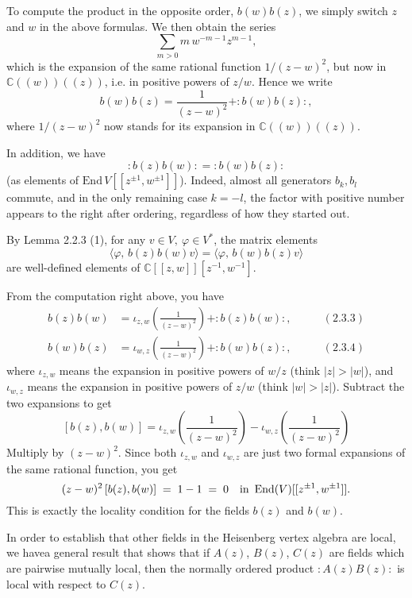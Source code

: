 \documentclass[12pt]{article}
\begin{document}
To compute the product in the opposite order, \(b(w)b(z)\),
we simply switch \(z\) and \(w\) in the above formulas.
We then obtain the series
\begin{equation}\label{2.3.3}
    \sum_{m>0} m\,w^{-m-1}z^{m-1},
\end{equation}
which is the expansion of the same rational function \(1/(z-w)^2\),
but now in \(\mathbb{C}((w))((z))\), i.e. in positive powers of \(z/w\).
Hence we write
\begin{equation}\label{2.3.4}
    b(w)b(z)
    = \frac{1}{(z-w)^2} + :b(w)b(z):,
\end{equation}
where \(1/(z-w)^2\) now stands for its expansion in \(\mathbb{C}((w))((z))\).

In addition, we have
\[
    :b(z)b(w): = :b(w)b(z):
\]
(as elements of \(\mathrm{End}\,V[[z^{\pm1},w^{\pm1}]]\)).
Indeed, almost all generators \(b_k,b_l\) commute, and in the only remaining case \(k=-l\),
the factor with positive number appears to the right after ordering, regardless of how they started out.

By Lemma 2.2.3 (1), for any \(v\in V,\ \varphi\in V^*\),
the matrix elements
\[
    \langle \varphi,\, b(z)b(w)v\rangle = \langle \varphi,\, b(w)b(z)v\rangle
\]
are well-defined elements of \(\mathbb{C}[[z,w]][z^{-1},w^{-1}]\).

From the computation right above, you have
\begin{align*}
    b(z)b(w) & = \iota_{z,w}\!\left(\frac{1}{(z-w)^2}\right) + :b(z)b(w):, \qquad & (2.3.3) \\
    b(w)b(z) & = \iota_{w,z}\!\left(\frac{1}{(z-w)^2}\right) + :b(w)b(z):, \qquad & (2.3.4)
\end{align*}
where $\iota_{z,w}$ means the expansion in positive powers of $w/z$ (think $|z|>|w|$), and $\iota_{w,z}$ means the expansion in positive powers of $z/w$ (think $|w|>|z|$). Subtract the two expansions to get
\[
    [b(z),b(w)]
    = \iota_{z,w}\!\left(\frac{1}{(z-w)^2}\right) -
    \iota_{w,z}\!\left(\frac{1}{(z-w)^2}\right)\]
Multiply by $(z-w)^2$. Since both $\iota_{z,w}$ and $\iota_{w,z}$ are just two formal expansions of the same rational function, you get
\[
    (z-w)^2\,[b(z),b(w)] \;=\; 1-1 \;=\; 0
    \quad\text{in }\operatorname{End}(V)[[z^{\pm1},w^{\pm1}]].
\]
This is exactly the locality condition for the fields $b(z)$ and $b(w)$.

In order to establish that other fields in the Heisenberg vertex algebra are local,
we havea general result that shows that if $A(z)$, $B(z)$, $C(z)$ are fields which are
pairwise mutually local, then the normally ordered product $:A(z)B(z):$ is local
with respect to $C(z)$.
\end{document}
